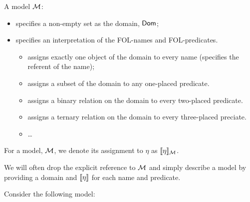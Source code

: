 \begin{definition}A model ${\mathcal{M}}$: \begin{itemize}
		\item specifies a non-empty set as the domain, $\mathsf{Dom}$;
		\item specifies an interpretation of the FOL-names and FOL-predicates. 
		\begin{itemize}
			\item assigns exactly one object of the domain to every name (specifies the referent of the name);
			\item assigns a subset of the domain to any one-placed predicate.
			\item assigns a binary relation on the domain to every two-placed predicate.
			\item assigns a ternary relation on the domain to every three-placed preciate.
			\item \ldots
		\end{itemize}
\end{itemize}\end{definition}

{For a model, ${\mathcal{M}}$, we denote its assignment to $\eta$ as $\llbracket \eta\rrbracket_{\mathcal{M}}$. 
	
	We will often drop the explicit reference to ${\mathcal{M}}$ and simply describe a model by providing a domain and $\llbracket \eta\rrbracket$ for each name and predicate.}


Consider the following model:


